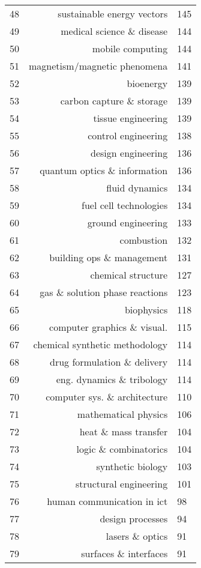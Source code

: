 \begin{spacing}{0.9}
\begin{longtable}[c]{r|r|>{\raggedleft\arraybackslash}m{2.3cm}}
{48} & {sustainable energy vectors} & {145}\\
{49} & {medical science \& disease} & {144}\\
{50} & {mobile computing} & {144}\\
{51} & {magnetism/magnetic phenomena} & {141}\\
{52} & {bioenergy} & {139}\\
{53} & {carbon capture \& storage} & {139}\\
{54} & {tissue engineering} & {139}\\
{55} & {control engineering} & {138}\\
{56} & {design engineering} & {136}\\
{57} & {quantum optics \& information} & {136}\\
{58} & {fluid dynamics} & {134}\\
{59} & {fuel cell technologies} & {134}\\
{60} & {ground engineering} & {133}\\
{61} & {combustion} & {132}\\
{62} & {building ops \& management} & {131}\\
{63} & {chemical structure} & {127}\\
{64} & {gas \& solution phase reactions} & {123}\\
{65} & {biophysics} & {118}\\
{66} & {computer graphics \& visual.} & {115}\\
{67} & {chemical synthetic methodology} & {114}\\
{68} & {drug formulation \& delivery} & {114}\\
{69} & {eng. dynamics \& tribology} & {114}\\
{70} & {computer sys. \& architecture} & {110}\\
{71} & {mathematical physics} & {106}\\
{72} & {heat \& mass transfer} & {104}\\
{73} & {logic \& combinatorics} & {104}\\
{74} & {synthetic biology} & {103}\\
{75} & {structural engineering} & {101}\\
{76} & {human communication in ict} & {98}\\
{77} & {design processes} & {94}\\
{78} & {lasers \& optics} & {91}\\
{79} & {surfaces \& interfaces} & {91}\\

\end{longtable}
\end{spacing}
